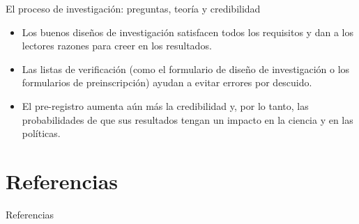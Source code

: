 \documentclass[
  ignorenonframetext,
]{beamer}
\begin{document}
\begin{frame}{El proceso de investigación: preguntas, teoría y
credibilidad}
\protect\hypertarget{el-proceso-de-investigaciuxf3n-preguntas-teoruxeda-y-credibilidad-1}{}
\begin{itemize}
\item
  Los buenos diseños de investigación satisfacen todos los requisitos y
  dan a los lectores razones para creer en los resultados.
\item
  Las listas de verificación (como el formulario de diseño de
  investigación o los formularios de preinscripción) ayudan a evitar
  errores por descuido.
\item
  El pre-registro aumenta aún más la credibilidad y, por lo tanto, las
  probabilidades de que sus resultados tengan un impacto en la ciencia y
  en las políticas.
\end{itemize}
\end{frame}

\hypertarget{referencias}{%
\section{Referencias}\label{referencias}}

\begin{frame}{Referencias}
\protect\hypertarget{referencias-1}{}
\end{frame}
\end{document}
